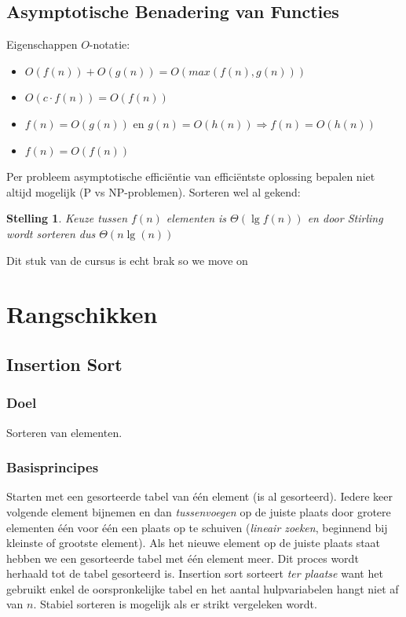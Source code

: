 \documentclass{article}
\newtheorem{stelling}{Stelling}
\begin{document}
\subsection{Asymptotische Benadering van Functies\label{asymp_ben}}
Eigenschappen $O$-notatie:
\begin{itemize}
	\item $O(f(n)) + O(g(n)) = O(max(f(n),g(n)))$
	\item $O(c \cdot f(n)) = O(f(n))$
	\item $f(n) = O(g(n))$ en $g(n) = O(h(n)) \Rightarrow f(n) = O(h(n))$
	\item $f(n) = O(f(n))$
\end{itemize}

Per probleem asymptotische efficiëntie van efficiëntste oplossing bepalen niet altijd mogelijk (P vs NP-problemen). Sorteren wel al gekend:

\begin{stelling}
Keuze tussen $f(n)$ elementen is $\Theta(\lg f(n))$ en door Stirling wordt sorteren dus $\Theta(n\lg(n))$
\end{stelling}

Dit stuk van de cursus is echt brak so we move on

\newpage

\section{Rangschikken\label{rangschikken}}
\subsection{Insertion Sort} %
\label{sub:insertion_sort}
\subsubsection{Doel} %
\label{sub:ins_sort_doel}
Sorteren van elementen.

\subsubsection{Basisprincipes} %
\label{sub:ins_sort_basisprincipes}
Starten met een gesorteerde tabel van één element (is al gesorteerd). Iedere keer volgende element bijnemen en dan \textit{tussenvoegen} op de juiste plaats door grotere elementen één voor één een plaats op te schuiven (\textit{lineair zoeken}, beginnend bij kleinste of grootste element). Als het nieuwe element op de juiste plaats staat hebben we een gesorteerde tabel met één element meer. Dit proces wordt herhaald tot de tabel gesorteerd is. Insertion sort sorteert \textit{ter plaatse} want het gebruikt enkel de oorspronkelijke tabel en het aantal hulpvariabelen hangt niet af van $n$. Stabiel sorteren is mogelijk als er strikt vergeleken wordt.
\end{document}

